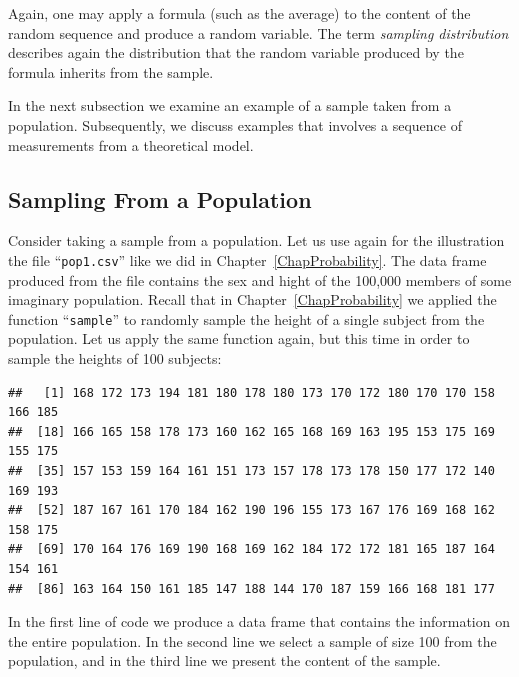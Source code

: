 \documentclass[]{krantz}
\makeatletter
\newenvironment{Shaded}{\begin{snugshade}}{\end{snugshade}}
\newcommand{\KeywordTok}[1]{\textcolor[rgb]{0.13,0.29,0.53}{\textbf{#1}}}
\newcommand{\DecValTok}[1]{\textcolor[rgb]{0.00,0.00,0.81}{#1}}
\newcommand{\StringTok}[1]{\textcolor[rgb]{0.31,0.60,0.02}{#1}}
\newcommand{\OperatorTok}[1]{\textcolor[rgb]{0.81,0.36,0.00}{\textbf{#1}}}
\newcommand{\NormalTok}[1]{#1}
\newenvironment{kframe}{%
\medskip{}
\setlength{\fboxsep}{.8em}
 \def\at@end@of@kframe{}%
 \ifinner\ifhmode%
  \def\at@end@of@kframe{\end{minipage}}%
  \begin{minipage}{\columnwidth}%
 \fi\fi%
 \def\FrameCommand##1{\hskip\@totalleftmargin \hskip-\fboxsep
 \colorbox{shadecolor}{##1}\hskip-\fboxsep
     \hskip-\linewidth \hskip-\@totalleftmargin \hskip\columnwidth}%
 \MakeFramed {\advance\hsize-\width
   \@totalleftmargin\z@ \linewidth\hsize
   \@setminipage}}%
 {\par\unskip\endMakeFramed%
 \at@end@of@kframe}
\renewenvironment{Shaded}{\begin{kframe}}{\end{kframe}}
\theoremstyle{definition}
\theoremstyle{definition}
\theoremstyle{definition}
\theoremstyle{remark}
\makeatother
\begin{document}
Again, one may apply a formula (such as the average) to the content of
the random sequence and produce a random variable. The term
\emph{sampling distribution} describes again the distribution that the
random variable produced by the formula inherits from the sample.

In the next subsection we examine an example of a sample taken from a
population. Subsequently, we discuss examples that involves a sequence
of measurements from a theoretical model.

\subsection{Sampling From a
Population}\label{sampling-from-a-population}

Consider taking a sample from a population. Let us use again for the
illustration the file ``\texttt{pop1.csv}'' like we did in
Chapter~\ref{ChapProbability}. The data frame produced from the file
contains the sex and hight of the 100,000 members of some imaginary
population. Recall that in Chapter~\ref{ChapProbability} we applied the
function ``\texttt{sample}'' to randomly sample the height of a single
subject from the population. Let us apply the same function again, but
this time in order to sample the heights of 100 subjects:

\begin{Shaded}
\end{Shaded}

\begin{verbatim}
##   [1] 168 172 173 194 181 180 178 180 173 170 172 180 170 170 158 166 185
##  [18] 166 165 158 178 173 160 162 165 168 169 163 195 153 175 169 155 175
##  [35] 157 153 159 164 161 151 173 157 178 173 178 150 177 172 140 169 193
##  [52] 187 167 161 170 184 162 190 196 155 173 167 176 169 168 162 158 175
##  [69] 170 164 176 169 190 168 169 162 184 172 172 181 165 187 164 154 161
##  [86] 163 164 150 161 185 147 188 144 170 187 159 166 168 181 177
\end{verbatim}

In the first line of code we produce a data frame that contains the
information on the entire population. In the second line we select a
sample of size 100 from the population, and in the third line we present
the content of the sample.
\end{document}
